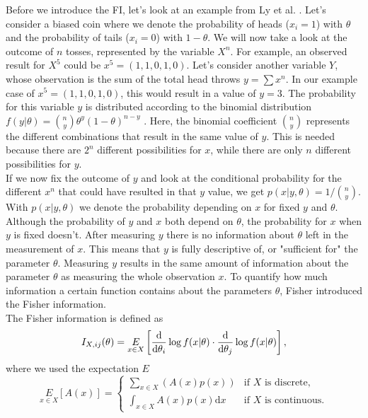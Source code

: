 Before we introduce the FI, let's look at an example from Ly et al. \cite{StatisticFisherInfoTutorial}. Let's consider a biased coin where we denote the probability of heads ($x_i = 1$) with $\theta$ and the probability of tails ($x_i = 0$) with $1-\theta$. We will now take a look at the outcome of $n$ tosses, represented by the variable $X^n$. For example, an observed result for $X^5$ could be $x^5 = (1,1,0,1,0)$. Let's consider another variable $Y$, whose observation is the sum of the total head throws $y = \sum x^n$. In our example case of $x^5 = (1,1,0,1,0)$, this would result in a value of $y = 3$. The probability for this variable $y$ is distributed according to the binomial distribution $f(y|\theta) = \binom{n}{y}\theta^y (1-\theta)^{n-y}$ \cite{BookOnBinomialDistributions}. Here, the binomial coefficient $\binom{n}{y}$ represents the different combinations that result in the same value of $y$. This is needed because there are $2^n$ different possibilities for $x$, while there are only $n$ different possibilities for $y$.\\
If we now fix the outcome of $y$ and look at the conditional probability for the different $x^n$ that could have resulted in that $y$ value, we get $p(x|y,\theta) = 1/ \binom{n}{y}$. With $p(x|y,\theta)$ we denote the probability depending on $x$ for fixed $y$ and $\theta$. Although the probability of $y$ and $x$ both depend on $\theta$, the probability for $x$ when $y$ is fixed doesn't. After measuring $y$ there is no information about $\theta$ left in the measurement of $x$. This means that $y$ is fully descriptive of, or "sufficient for" the parameter $\theta$. Measuring $y$ results in the same amount of information about the parameter $\theta$ as measuring the whole observation $x$. To quantify how much information a certain function contains about the parameters $\theta$, Fisher introduced the Fisher information.\\
The Fisher information is defined as 
\begin{equation}\label{eq:FIDefinition}
	I_{X,ij}(\theta) = \underset{x\in X}{E} \left[\frac{\mathrm{d}}{\mathrm{d}\theta_i}\log f(x|\theta) \cdot \frac{\mathrm{d}}{\mathrm{d}\theta_j}\log f(x|\theta)\right],
\end{equation}
where we used the expectation $E$
\begin{equation}
	\underset{x\in X}{E} \left[A(x)\right] = 
	\begin{cases}
		\sum_{x\in X} \left(A(x) p(x)\right) &\text{if $X$ is discrete},\\
		\int_{x\in X} A(x) p(x) \mathrm{d}x &\text{if $X$ is continuous}.
	\end{cases}
\end{equation}
